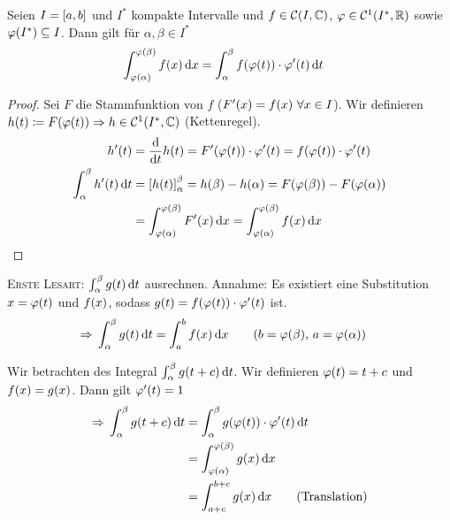 \begin{satz}[Substitutionsregel] %
    Seien $I=\left[a,b\right]$ und $I^{*}$ kompakte Intervalle und $f\in\mC\of{I, \C}$, $\varphi\in\mC^{1}\of{I^{*}, \R}$ sowie $\varphi\of{I^{*}}\subseteq I$. Dann gilt für $\alpha, \beta \in I^{*}$
    \begin{align*}
        \int_{\varphi\of{\alpha}}^{\varphi\of{\beta}} f\of{x} \dif x &= \int_{\alpha}^{\beta} f\of{\varphi\of{t}}\cdot\varphi'\of{t} \dif t
    \end{align*}
    \begin{proof}
        Sei $F$ die Stammfunktion von $f$ ($F'\of{x} = f\of{x}~\forall x\in I$). Wir definieren $h\of{t}\coloneqq F\of{\varphi\of{t}} \impl h\in\mC^{1}\of{I^{*}, \C}$ (Kettenregel).
        \begin{align*}
            h'\of{t} &= \frac{\dif}{\dif t} h\of{t} = F'\of{\varphi\of{t}}\cdot\varphi'\of{t} = f\of{\varphi\of{t}}\cdot\varphi'\of{t}\\
            \int_{\alpha}^{\beta} h'\of{t} \dif t &= \interv{h\of{t}}_{\alpha}^{\beta} = h\of{\beta}-h\of{\alpha} = F\of{\varphi\of{\beta}} - F\of{\varphi\of{\alpha}}\\
            &= \int_{\varphi\of{\alpha}}^{\varphi\of{\beta}} F'\of{x} \dif x = \int_{\varphi\of{\alpha}}^{\varphi\of{\beta}} f\of{x} \dif x\qedhere
        \end{align*}
    \end{proof}
    \noindent \textsc{Erste Lesart:} $ \int_{\alpha}^{\beta} g\of{t} \dif t$ ausrechnen. Annahme: Es existiert eine Substitution $x=\varphi\of{t}$ und $f\of{x}$, sodass $g\of{t} = f\of{\varphi\of{t}}\cdot\varphi'\of{t}$ ist.
    \begin{align*}
        \impl \int_{\alpha}^{\beta} g\of{t} \dif t &= \int_{a}^{b} f\of{x} \dif x\tag{$b=\varphi\of{\beta}$, $a = \varphi\of{\alpha}$}
    \end{align*}
\end{satz}

\begin{beispiel}
    Wir betrachten des Integral $\int_{\alpha}^{\beta} g\of{t+c} \dif t$. Wir definieren $\varphi\of{t} = t+c$ und $f\of{x} = g\of{x}$. Dann gilt $\varphi'\of{t} = 1$
    \begin{align*}
        \impl \int_{\alpha}^{\beta} g\of{t+c} \dif t &= \int_{\alpha}^{\beta} g\of{\varphi\of{t}}\cdot\varphi'\of{t} \dif t\\
        &= \int_{\varphi\of{\alpha}}^{\varphi\of{\beta}} g\of{x} \dif x\\
        &= \int_{a+c}^{b+c} g\of{x} \dif x\tag{Translation}
    \end{align*}
\end{beispiel}

